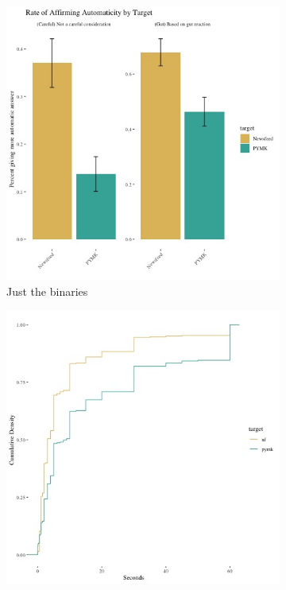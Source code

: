 \documentclass[12pt,letterpaper]{article}
\begin{document}
\begin{figure}
\begin{subfigure}{.5\textwidth}
    \end{subfigure}
    \begin{subfigure}{.5\textwidth}
        \centering
        \includegraphics[width=1\linewidth, trim={0cm 0 3cm 2cm}, clip]{Output/Graphs/Experiments/Automaticity/bar chart binary measures.jpg} 
        \caption{Just the binaries}
        \label{fig:auto_binaries}
    \end{subfigure}
    \begin{subfigure}{.5\textwidth}
        \centering
        \includegraphics[width=1\linewidth, trim={0cm 0 2cm 0cm}, clip]{Output/Graphs/Experiments/Automaticity/speed cdf - bin over 60.jpg}  

\end{subfigure}
\end{figure}
\end{document}
